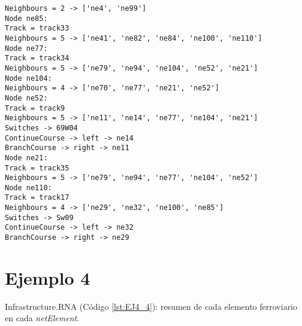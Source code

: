 \begin{lstlisting}[language = {}, tabsize=4, basicstyle=\footnotesize\ttfamily, showspaces=false, showstringspaces=false, caption = Infrastructure.RNA, label = {lst:EJ3_4}]
Neighbours = 2 -> ['ne4', 'ne99']
Node ne85:
Track = track33
Neighbours = 5 -> ['ne41', 'ne82', 'ne84', 'ne100', 'ne110']
Node ne77:
Track = track34
Neighbours = 5 -> ['ne79', 'ne94', 'ne104', 'ne52', 'ne21']
Node ne104:
Neighbours = 4 -> ['ne70', 'ne77', 'ne21', 'ne52']
Node ne52:
Track = track9
Neighbours = 5 -> ['ne11', 'ne14', 'ne77', 'ne104', 'ne21']
Switches -> 69W04
ContinueCourse -> left -> ne14
BranchCourse -> right -> ne11
Node ne21:
Track = track35
Neighbours = 5 -> ['ne79', 'ne94', 'ne77', 'ne104', 'ne52']
Node ne110:
Track = track17
Neighbours = 4 -> ['ne29', 'ne32', 'ne100', 'ne85']
Switches -> Sw09
ContinueCourse -> left -> ne32
BranchCourse -> right -> ne29
	\end{lstlisting}	
	\section{Ejemplo 4}
	Infrastructure.RNA (Código \ref{lst:EJ4_4}): resumen de cada elemento ferroviario en cada \textit{netElement}.
	
